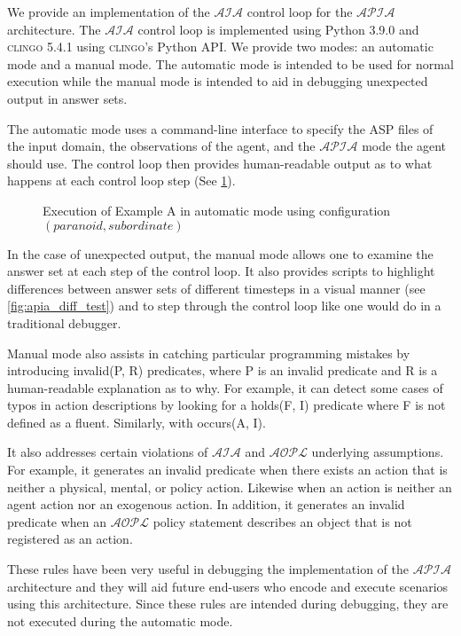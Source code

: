 We provide an implementation of the $\mathcal{AIA}$ control loop for the $\mathcal{APIA}$ architecture.
The $\mathcal{AIA}$ control loop is implemented using Python 3.9.0 and \textsc{clingo} 5.4.1 using \textsc{clingo}'s Python API.
We provide two modes: an automatic mode and a manual mode.
The automatic mode is intended to be used for normal execution while the manual mode is intended to aid in debugging unexpected output in answer sets.

The automatic mode uses a command-line interface to specify the ASP files of the input domain, the observations of the agent, and the $\mathcal{APIA}$ mode the agent should use.
The control loop then provides human-readable output as to what happens at each control loop step (See \cref{fig:apia_example_a_execution_paraniod_subordinate}).

\begin{figure}[h]
    \centering
    
    \caption{Execution of Example A in automatic mode using configuration $(paranoid, subordinate)$}
    \label{fig:apia_example_a_execution_paraniod_subordinate}
\end{figure}

In the case of unexpected output, the manual mode allows one to examine the answer set at each step of the control loop.
It also provides scripts to highlight differences between answer sets of different timesteps in a visual manner (see \cref{fig:apia_diff_test}) and to step through the control loop like one would do in a traditional debugger.

Manual mode also assists in catching particular programming mistakes by introducing invalid(P, R) predicates, where P is an invalid predicate and R is a human-readable explanation as to why.
For example, it can detect some cases of typos in action descriptions by looking for a holds(F, I) predicate where F is not defined as a fluent.
Similarly, with occurs(A, I).

It also addresses certain violations of $\mathcal{AIA}$ and $\mathcal{AOPL}$ underlying assumptions.
For example, it generates an invalid predicate when there exists an action that is neither a physical, mental, or policy action.
Likewise when an action is neither an agent action nor an exogenous action.
In addition, it generates an invalid predicate when an $\mathcal{AOPL}$ policy statement describes an object that is not registered as an action.

These rules have been very useful in debugging the implementation of the $\mathcal{APIA}$ architecture and they will aid future end-users who encode and execute scenarios using this architecture.
Since these rules are intended during debugging, they are not executed during the automatic mode.
